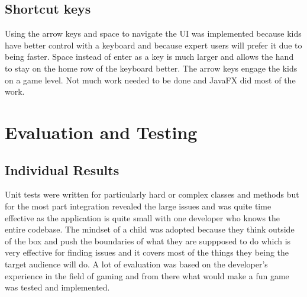 \documentclass[conference]{IEEEtran}
\begin{document}
	\subsection{Shortcut keys}
		Using the arrow keys and space to navigate the UI was implemented because kids have better control with a keyboard and because expert users will prefer it due to being faster. Space instead of enter as a key is much larger and allows the hand to stay on the home row of the keyboard better. The arrow keys engage the kids on a game level. Not much work needed to be done and JavaFX did most of the work.

\section{Evaluation and Testing}
	\subsection{Individual Results}
		Unit tests were written for particularly hard or complex classes and methods but for the most part integration revealed the large issues and was quite time effective as the application is quite small with one developer who knows the entire codebase. The mindset of a child was adopted because they think outside of the box and push the boundaries of what they are suppposed to do which is very effective for finding issues and it covers most of the things they being the target audience will do. A lot of evaluation was based on the developer's experience in the field of gaming and from there what would make a fun game was tested and implemented.
\end{document}
